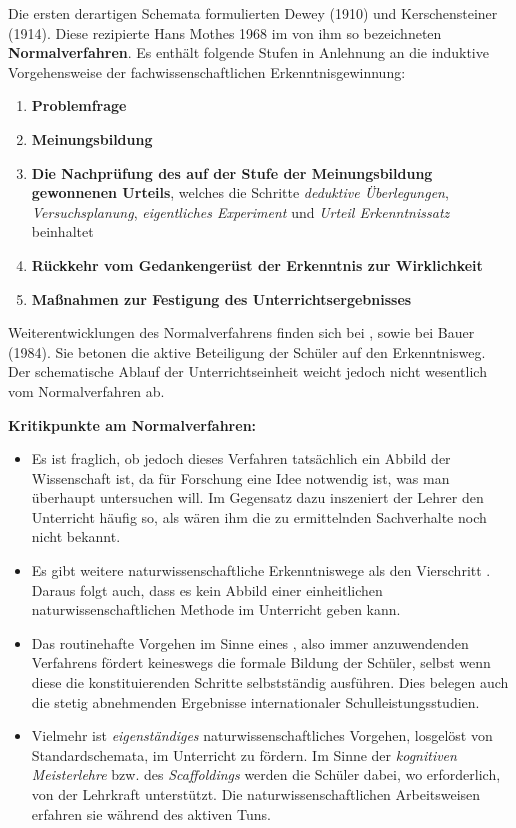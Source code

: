 \mip
Die ersten derartigen Schemata formulierten Dewey (1910) und Kerschensteiner (1914). Diese rezipierte Hans Mothes 1968 im von ihm so bezeichneten \textbf{Normalverfahren}. Es enthält folgende Stufen in Anlehnung an die induktive Vorgehensweise der fachwissenschaftlichen Erkenntnisgewinnung:

\begin{enumerate}
	\item {\bf Problemfrage}
	\item {\bf Meinungsbildung}
	\item {\bf Die Nachpr\"{u}fung des auf der Stufe der Meinungsbildung gewonnenen Urteils}, welches die Schritte \emph{deduktive \"{U}berlegungen}, \emph{Versuchsplanung},  \emph{eigentliches Experiment} und \emph{Urteil Erkenntnissatz} beinhaltet
	\item {\bf R\"{u}ckkehr vom Gedankenger\"{u}st der Erkenntnis zur Wirklichkeit}
	\item {\bf Ma\ss nahmen zur Festigung des Unterrichtsergebnisses}
\end{enumerate}

Weiterentwicklungen des Normalverfahrens finden sich bei \textcite{DuitHausslerKircher}, \textcite{Ploeger} sowie bei Bauer (1984). Sie betonen die aktive Beteiligung der Schüler auf den Erkenntnisweg. Der schematische Ablauf der Unterrichtseinheit weicht jedoch nicht wesentlich vom Normalverfahren ab.

\mip
{\bf Kritikpunkte am Normalverfahren:}
\begin{itemize}
	\item Es ist fraglich, ob jedoch dieses Verfahren tats\"{a}chlich ein Abbild der Wissenschaft ist, da f\"{u}r Forschung eine Idee notwendig ist, was man \"{u}berhaupt untersuchen will. Im Gegensatz dazu inszeniert der Lehrer den Unterricht h\"{a}ufig so, als w\"{a}ren ihm die zu ermittelnden Sachverhalte noch nicht bekannt.
	\item Es gibt weitere naturwissenschaftliche Erkenntniswege als den Vierschritt . Daraus folgt auch, dass es kein Abbild einer einheitlichen naturwissenschaftlichen Methode im Unterricht geben kann.
	\item Das routinehafte Vorgehen im Sinne eines , also immer anzuwendenden Verfahrens fördert keineswegs die formale Bildung der Schüler, selbst wenn diese die konstituierenden Schritte selbstständig ausführen. Dies belegen auch die stetig abnehmenden Ergebnisse internationaler Schulleistungsstudien.
	\item Vielmehr ist \emph{eigenständiges} naturwissenschaftliches Vorgehen, losgelöst von Standardschemata, im Unterricht zu fördern. Im Sinne der \emph{kognitiven Meisterlehre} bzw. des \emph{Scaffoldings} werden die Schüler dabei, wo erforderlich, von der Lehrkraft unterstützt. Die naturwissenschaftlichen Arbeitsweisen erfahren sie während des aktiven Tuns.
\end{itemize}



